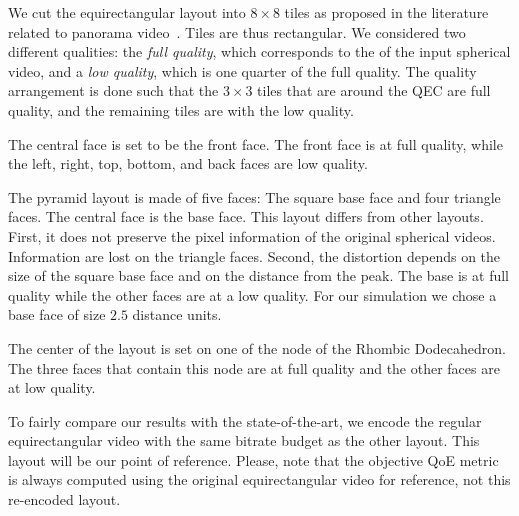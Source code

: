 
We cut the equirectangular layout into
$8\times8$ tiles as proposed in the literature related to panorama
video~\cite{gaddam_tiling_2015}. Tiles are thus rectangular. We
considered two different qualities: the \emph{full quality}, which
corresponds to the  of the input spherical video, and
a \emph{low quality}, which is one quarter of the full quality. The
quality arrangement is done such that the $3\times3$
tiles that are around the \ac{QEC} are full quality, and the
remaining tiles are with the low quality.

 The central face is set to be the front face. The
front face is at full quality, while the left, right, top, bottom, and
back faces are low quality.

 The pyramid layout is made of five faces: The square
base face and four triangle faces. The central face is the base face.
This layout differs from other layouts. First, it does not preserve
the pixel information of the original spherical videos. Information
are lost on the triangle faces. Second, the distortion depends on the
size of the square base face and on the distance from the peak.  The
base is at full quality while the other faces are at a low quality.
For our simulation we chose a base face of size $2.5$ distance units.

 The center of the layout is set on one of
the node of the Rhombic Dodecahedron. The three faces that contain
this node are at full quality and the other faces are at low quality.

 To fairly compare our results with the
state-of-the-art, we encode the regular equirectangular video with the
same bitrate budget as the other layout. This layout will be our point
of reference. Please, note that the objective \ac{QoE} metric is
always computed using the original equirectangular video for
reference, not this re-encoded layout.

